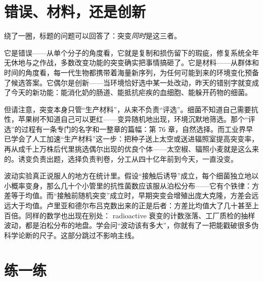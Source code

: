 \section{错误、材料，还是创新}

绕了一圈，标题的问题可以回答了：突变\emph{同时}是这三者。

它是错误——从单个分子的角度看，它就是复制和损伤留下的瑕疵，修复系统全年无休地与之作战，多数改变功能的突变确实把事情搞砸了。它是材料——从群体和时间的角度看，每一代生物都携带着海量新序列，为任何可能到来的环境变化预备了候选答案。它偶尔是创新——当环境恰好选中某一处改动，昨天的错别字就变成了今天的新功能：能消化奶的肠道、能抵抗疟疾的血细胞、能躲开药物的细菌。

但请注意，突变本身只管“生产材料”，从来不负责“评选”。细菌不知道自己需要抗性，苹果树不知道自己可以更红——变异随机地出现，环境沉默地筛选。那个“评选”的过程有一条专门的名字和一整章的篇幅：第 76 章，自然选择。而工业界早已学会了人工加速“生产材料”这一步：把种子送上太空或送进辐照室提高突变率，再从成千上万株后代里挑选偶尔出现的优良个体——太空椒、辐照小麦就是这么来的。诱变负责出题，选择负责判卷，分工从四十亿年前到今天，一直没变。

\begin{tiaozhan}
波动实验真正说服人的地方在统计里。假设“接触后诱导”成立，每个细菌独立地以小概率变身，那么几十个小管里的抗性菌数应该服从泊松分布——它有个铁律：方差等于均值。而“接触前随机突变”成立时，早期突变会增殖出庞大克隆，方差会远远大于均值。卢里亚和德尔布吕克数出来的正是后者：方差比均值大了几十甚至上百倍。同样的数学也出现在别处： radioactive 衰变的计数涨落、工厂质检的抽样波动，都是泊松分布的地盘。学会问“波动该有多大”，你就有了一把能戳破很多伪科学论断的尺子。这部分跳过不影响主线。
\end{tiaozhan}

\section*{练一练}

